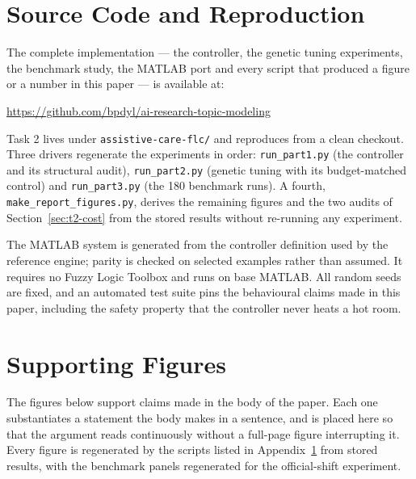 %

\section{Source Code and Reproduction}
\label{app:t2-code}

The complete implementation --- the controller, the genetic tuning experiments,
the benchmark study, the MATLAB port and every script that produced a figure or
a number in this paper --- is available at:

\begin{center}
\small\url{https://github.com/bpdyl/ai-research-topic-modeling}
\end{center}

\noindent Task 2 lives under \texttt{assistive-care-flc/} and reproduces from a
clean checkout. Three drivers regenerate the experiments in order:
\texttt{run\_part1.py} (the controller and its structural audit),
\texttt{run\_part2.py} (genetic tuning with its budget-matched control) and
\texttt{run\_part3.py} (the 180 benchmark runs). A fourth,
\texttt{make\_report\_figures.py}, derives the remaining figures and the two
audits of Section~\ref{sec:t2-cost} from the stored results without re-running
any experiment.

The MATLAB system is generated from the controller definition used by
the reference engine; parity is checked on selected examples rather than assumed. It requires no
Fuzzy Logic Toolbox and runs on base MATLAB. All random seeds are fixed, and an
automated test suite pins the behavioural claims made in this paper, including
the safety property that the controller never heats a hot room.

\section{Supporting Figures}
\label{app:t2}

The figures below support claims made in the body of the paper. Each one
substantiates a statement the body makes in a sentence, and is placed here so
that the argument reads continuously without a full-page figure interrupting
it. Every figure is regenerated by the scripts listed in
Appendix~\ref{app:t2-code} from stored results, with the benchmark panels regenerated
for the official-shift experiment.



